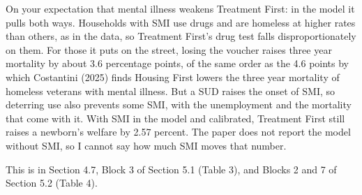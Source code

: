\documentclass[11pt]{article}
\begin{document}
\begin{response}
On your expectation that mental illness weakens Treatment First: in the model it
pulls both ways. Households with SMI use drugs and are homeless at higher rates
than others, as in the data, so Treatment First's drug test falls
disproportionately on them. For those it puts on the street, losing the voucher
raises three year mortality by about 3.6 percentage points, of the same order as
the 4.6 points by which Costantini (2025) finds Housing First lowers the three
year mortality of homeless veterans with mental illness. But a SUD raises the
onset of SMI, so deterring use also prevents some SMI, with the unemployment and
the mortality that come with it. With SMI in the model and calibrated, Treatment
First still raises a newborn's welfare by 2.57 percent. \open The paper does not
report the model without SMI, so I cannot say how much SMI moves that number.

This is in Section 4.7, Block 3 of Section 5.1 (Table 3), and Blocks 2 and 7 of
Section 5.2 (Table 4).
\end{response}
\end{document}
